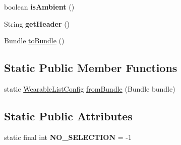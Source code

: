 \begin{DoxyCompactItemize}
\item 
boolean {\bfseries is\+Ambient} ()\hypertarget{classcom_1_1google_1_1devrel_1_1wcl_1_1widgets_1_1list_1_1WearableListConfig_a03ca5621166f95a54af1622d99b0766d}{}\label{classcom_1_1google_1_1devrel_1_1wcl_1_1widgets_1_1list_1_1WearableListConfig_a03ca5621166f95a54af1622d99b0766d}

\item 
String {\bfseries get\+Header} ()\hypertarget{classcom_1_1google_1_1devrel_1_1wcl_1_1widgets_1_1list_1_1WearableListConfig_a02805826b0920cce01575b889b62ef40}{}\label{classcom_1_1google_1_1devrel_1_1wcl_1_1widgets_1_1list_1_1WearableListConfig_a02805826b0920cce01575b889b62ef40}

\item 
Bundle \hyperlink{classcom_1_1google_1_1devrel_1_1wcl_1_1widgets_1_1list_1_1WearableListConfig_a25d3976a6ad51fcd5b42405d4068904f}{to\+Bundle} ()
\end{DoxyCompactItemize}
\subsection*{Static Public Member Functions}
\begin{DoxyCompactItemize}
\item 
static \hyperlink{classcom_1_1google_1_1devrel_1_1wcl_1_1widgets_1_1list_1_1WearableListConfig}{Wearable\+List\+Config} \hyperlink{classcom_1_1google_1_1devrel_1_1wcl_1_1widgets_1_1list_1_1WearableListConfig_a05e397d7bf4d3069378dc4e8fc70a495}{from\+Bundle} (Bundle bundle)
\end{DoxyCompactItemize}
\subsection*{Static Public Attributes}
\begin{DoxyCompactItemize}
\item 
static final int {\bfseries N\+O\+\_\+\+S\+E\+L\+E\+C\+T\+I\+ON} = -\/1\hypertarget{classcom_1_1google_1_1devrel_1_1wcl_1_1widgets_1_1list_1_1WearableListConfig_a8676fb6e3ca7f059be199e4ca71186b5}{}\label{classcom_1_1google_1_1devrel_1_1wcl_1_1widgets_1_1list_1_1WearableListConfig_a8676fb6e3ca7f059be199e4ca71186b5}

\end{DoxyCompactItemize}


